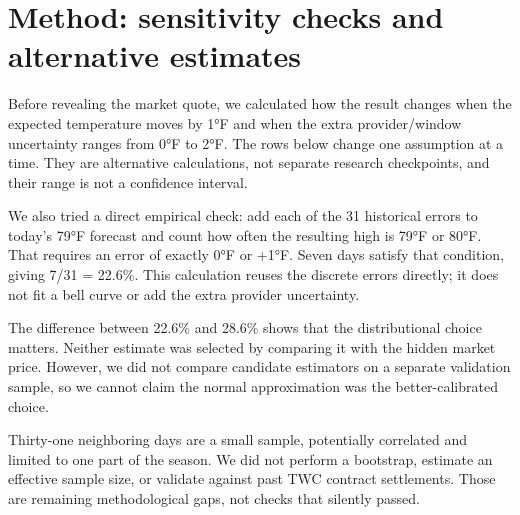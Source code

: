 \documentclass[11pt]{article}
\begin{document}
\section*{\textcolor{epdarkgreen}{Method: sensitivity checks and alternative estimates}}
Before revealing the market quote, we calculated how the result changes when the expected temperature moves by 1°F and when the extra provider/window uncertainty ranges from 0°F to 2°F. The rows below change one assumption at a time. They are alternative calculations, not separate research checkpoints, and their range is not a confidence interval.


We also tried a direct empirical check: add each of the 31 historical errors to today’s 79°F forecast and count how often the resulting high is 79°F or 80°F. That requires an error of exactly 0°F or +1°F. Seven days satisfy that condition, giving 7/31 = 22.6\%. This calculation reuses the discrete errors directly; it does not fit a bell curve or add the extra provider uncertainty.


The difference between 22.6\% and 28.6\% shows that the distributional choice matters. Neither estimate was selected by comparing it with the hidden market price. However, we did not compare candidate estimators on a separate validation sample, so we cannot claim the normal approximation was the better-calibrated choice.


Thirty-one neighboring days are a small sample, potentially correlated and limited to one part of the season. We did not perform a bootstrap, estimate an effective sample size, or validate against past TWC contract settlements. Those are remaining methodological gaps, not checks that silently passed.
\end{document}

